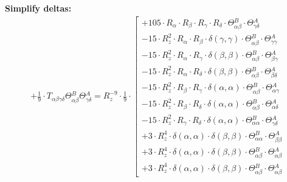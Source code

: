 \documentclass{article}
\begin{document}
\textbf{Simplify deltas:}
\begin{subequations}\begin{gather}
+ \frac{1}{9} \cdot T_{\alpha{}\beta{}\gamma{}\delta{}} \Theta{}^{B}_{\alpha{}\beta{}} \Theta{}^{A}_{\gamma{}\delta{}} = R_{z}^{-9} \cdot \frac{1}{9} \cdot  \left[ \begin{array}{c} 
 		+ 105 \cdot R_{\alpha{}} \cdot R_{\beta{}} \cdot R_{\gamma{}} \cdot R_{\delta{}} \cdot \Theta{}^{B}_{\alpha{}\beta{}} \cdot \Theta{}^{A}_{\gamma{}\delta{}} 
 \\[0.2em] 		 - 15 \cdot R_{z}^{2} \cdot R_{\alpha{}} \cdot R_{\beta{}} \cdot \delta{}\left(\gamma{}, \gamma{}\right) \cdot \Theta{}^{B}_{\alpha{}\beta{}} \cdot \Theta{}^{A}_{\gamma{}\gamma{}} 
 \\[0.2em] 		 - 15 \cdot R_{z}^{2} \cdot R_{\alpha{}} \cdot R_{\gamma{}} \cdot \delta{}\left(\beta{}, \beta{}\right) \cdot \Theta{}^{B}_{\alpha{}\beta{}} \cdot \Theta{}^{A}_{\beta{}\gamma{}} 
 \\[0.2em] 		 - 15 \cdot R_{z}^{2} \cdot R_{\alpha{}} \cdot R_{\delta{}} \cdot \delta{}\left(\beta{}, \beta{}\right) \cdot \Theta{}^{B}_{\alpha{}\beta{}} \cdot \Theta{}^{A}_{\beta{}\delta{}} 
 \\[0.2em] 		 - 15 \cdot R_{z}^{2} \cdot R_{\beta{}} \cdot R_{\gamma{}} \cdot \delta{}\left(\alpha{}, \alpha{}\right) \cdot \Theta{}^{B}_{\alpha{}\beta{}} \cdot \Theta{}^{A}_{\alpha{}\gamma{}} 
 \\[0.2em] 		 - 15 \cdot R_{z}^{2} \cdot R_{\beta{}} \cdot R_{\delta{}} \cdot \delta{}\left(\alpha{}, \alpha{}\right) \cdot \Theta{}^{B}_{\alpha{}\beta{}} \cdot \Theta{}^{A}_{\alpha{}\delta{}} 
 \\[0.2em] 		 - 15 \cdot R_{z}^{2} \cdot R_{\gamma{}} \cdot R_{\delta{}} \cdot \delta{}\left(\alpha{}, \alpha{}\right) \cdot \Theta{}^{B}_{\alpha{}\alpha{}} \cdot \Theta{}^{A}_{\gamma{}\delta{}} 
 \\[0.2em] 		 + 3 \cdot R_{z}^{4} \cdot \delta{}\left(\alpha{}, \alpha{}\right) \cdot \delta{}\left(\beta{}, \beta{}\right) \cdot \Theta{}^{B}_{\alpha{}\alpha{}} \cdot \Theta{}^{A}_{\beta{}\beta{}} 
 \\[0.2em] 		 + 3 \cdot R_{z}^{4} \cdot \delta{}\left(\alpha{}, \alpha{}\right) \cdot \delta{}\left(\beta{}, \beta{}\right) \cdot \Theta{}^{B}_{\alpha{}\beta{}} \cdot \Theta{}^{A}_{\alpha{}\beta{}} 
 \\[0.2em] 		 + 3 \cdot R_{z}^{4} \cdot \delta{}\left(\alpha{}, \alpha{}\right) \cdot \delta{}\left(\beta{}, \beta{}\right) \cdot \Theta{}^{B}_{\alpha{}\beta{}} \cdot \Theta{}^{A}_{\alpha{}\beta{}}

\end{array}
\end{gather}
\end{subequations}
\end{document}
